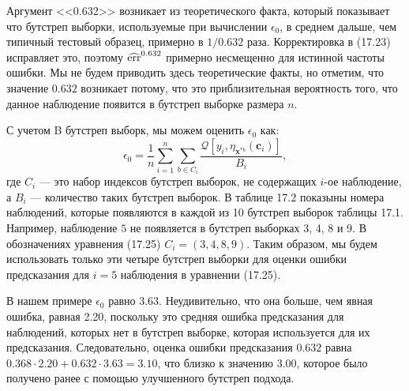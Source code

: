 Аргумент <<0.632>> возникает из теоретического факта, который показывает что бутстреп выборки, используемые при вычислении $\epsilon_{0}$, в среднем дальше, чем типичный тестовый образец, примерно в $1 / 0.632$ раза. Корректировка в (17.23) исправляет это, поэтому $\widehat{\text{err}}^{0.632}$ примерно несмещенно для истинной частоты ошибки. Мы не будем приводить здесь теоретические факты, но отметим, что значение $0.632$ возникает потому, что это приблизительная вероятность того, что данное наблюдение появится в бутстреп выборке размера $n$.

С учетом B бутстреп выборк, мы можем оценить $\epsilon_{0}$ как:
\begin{equation}
\epsilon_{0} = \frac{1}{n}\sum_{i = 1}^{n} \sum_{b \in C_{i}} \frac{ \mathcal{Q}[y_{i},  \eta_{\textbf{x}^{*b}}(\textbf{c}_{i})] }{B_{i}},
\end{equation}
где $C_{i}$ --- это набор индексов бутстреп выборок, не содержащих $i$-ое наблюдение, а $B_{i}$ --- количество таких бутстреп выборок. В таблице 17.2 показыны номера наблюдений, которые появляются в каждой из 10 бутстреп выборок таблицы 17.1. Например, наблюдение $5$ не появляется в бутстреп выборках 3, 4, 8 и 9. В обозначениях уравнения (17.25) $C_{i} = (3, 4, 8, 9)$. Таким образом, мы будем использовать только эти четыре бутстреп выборки для оценки ошибки предсказания для $i = 5$ наблюдения в уравнении (17.25).

В нашем примере $\epsilon_{0}$ равно $3.63$. Неудивительно, что она больше, чем явная ошибка, равная 2.20, поскольку это средняя ошибка предсказания для наблюдений, которых нет в бутстреп выборке, которая используется для их предсказания. Следовательно, оценка ошибки предсказания $0.632$ равна $0.368 \cdot 2.20 + 0.632 \cdot 3.63 = 3.10$, что близко к значению $3.00$, которое было получено ранее с помощью улучшенного бутстреп подхода. 


